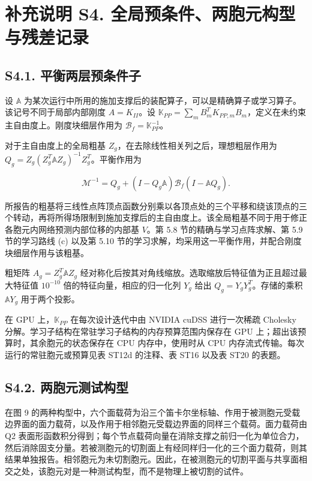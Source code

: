 \documentclass[preprint,12pt,authoryear]{elsarticle}
\begin{document}
\section{补充说明 S4. 全局预条件、两胞元构型与残差记录}

\subsection{S4.1. 平衡两层预条件子}

设 \(\mathbb A\) 为某次运行中所用的施加支撑后的装配算子，可以是精确算子或学习算子。该记号不同于局部内部刚度 \(A=K_{II}\)。设
\(\mathbb K_{PP}=\sum_mB_m^TK_{PP,m}B_m\)，定义在未约束主自由度上。刚度块细层作用为 \(\mathcal B_f=\mathbb K_{PP}^{-1}\)。

对于主自由度上的全局粗基 \(Z_g\)，在去除线性相关列之后，理想粗层作用为
\(Q_g=Z_g(Z_g^T\mathbb A Z_g)^{-1}Z_g^T\)。平衡作用为

\[
\mathcal M^{-1}=Q_g+(I-Q_g\mathbb A)\mathcal B_f(I-\mathbb A Q_g).
\]

所报告的粗基将三线性点阵顶点函数分别乘以各顶点处的三个平移和绕该顶点的三个转动，再将所得场限制到施加支撑后的主自由度上。该全局粗基不同于用于修正各胞元内网络预测内部位移的内部基 \(V\)。第 5.8 节的精确与学习点阵求解、第 5.9 节的学习路线 (c) 以及第 5.10 节的学习求解，均采用这一平衡作用，并配合刚度块细层作用与该粗基。

粗矩阵 \(A_g=Z_g^T\mathbb A Z_g\) 经对称化后按其对角线缩放。选取缩放后特征值为正且超过最大特征值 \(10^{-10}\) 倍的特征向量，相应的归一化列 \(Y_g\) 给出 \(Q_g=Y_gY_g^T\)。存储的乘积 \(\mathbb A Y_g\) 用于两个投影。

在 GPU 上，\(\mathbb K_{PP}\) 在每次设计迭代中由 NVIDIA cuDSS 进行一次稀疏 Cholesky 分解。学习子结构在常驻学习子结构的内存预算范围内保存在 GPU 上；超出该预算时，其余胞元的状态保存在 CPU 内存中，使用时从 CPU 内存流式传输。每次运行的常驻胞元或预算见表 ST12d 的注释、表 ST16 以及表 ST20 的表题。

\subsection{S4.2. 两胞元测试构型}

在图 9 的两种构型中，六个面载荷为沿三个笛卡尔坐标轴、作用于被测胞元受载边界面的面力载荷，以及作用于相邻胞元受载边界面的同样三个载荷。面力载荷由 Q2 表面形函数积分得到；每个节点载荷向量在消除支撑之前归一化为单位合力，然后消除固支分量。若被测胞元的切割面上有经同样归一化的三个面力载荷，则其结果单独报告。相邻胞元为未切割胞元。因此，在被测胞元的切割平面与共享面相交之处，该胞元对是一种测试构型，而不是物理上被切割的试件。
\end{document}
